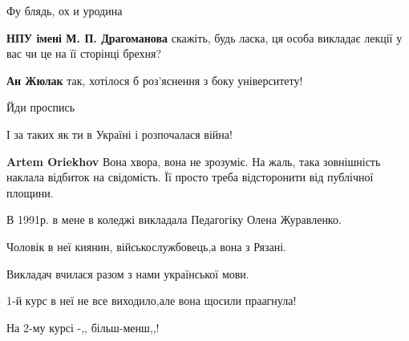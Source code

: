 \begin{itemize}
Фу блядь, ох и уродина





\textbf{НПУ імені М. П. Драгоманова} скажіть, будь ласка, ця особа викладає лекції у вас чи це на її сторінці брехня?

\begin{itemize}

\textbf{Ан Жюлак} так, хотілося б роз'яснення з боку університету!
\end{itemize}


Йди проспись


І за таких як ти в Україні і розпочалася війна!

\begin{itemize}

\textbf{Artem Oriekhov} Вона хвора, вона не зрозуміє. На жаль, така зовнішність
наклала відбиток на свідомість. Її просто треба відсторонити від публічної
площини.

\end{itemize}



В 1991р. в мене в коледжі викладала Педагогіку Олена Журавленко.

Чоловік в неї киянин, військослужбовець,а вона з Рязані.

Викладач вчилася разом з нами української мови.

1-й курс в неї не все виходило,але вона щосили праагнула!

На 2-му курсі -,, більш-менш,,!


\end{itemize}
